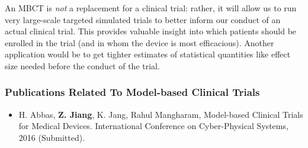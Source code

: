 \documentclass[a4paper,11pt]{article}
\begin{document}
An MBCT is \emph{not} a replacement for a clinical trial: rather, it will allow us to run very large-scale targeted simulated trials to better inform our conduct of an actual clinical trial.
This provides valuable insight into which patients should be enrolled in the trial (and in whom the device is most efficacious).
Another application would be to get tighter estimates of statistical quantities like effect size needed before the conduct of the trial. 
%
%
%
\subsubsection{Publications Related To Model-based Clinical Trials}
\begin{itemize}
\item H. Abbas, \textbf{Z. Jiang}, K. Jang, Rahul Mangharam, Model-based Clinical Trials for Medical Devices. International Conference on Cyber-Physical Systems, 2016 (Submitted).
\end{itemize}
\end{document}
